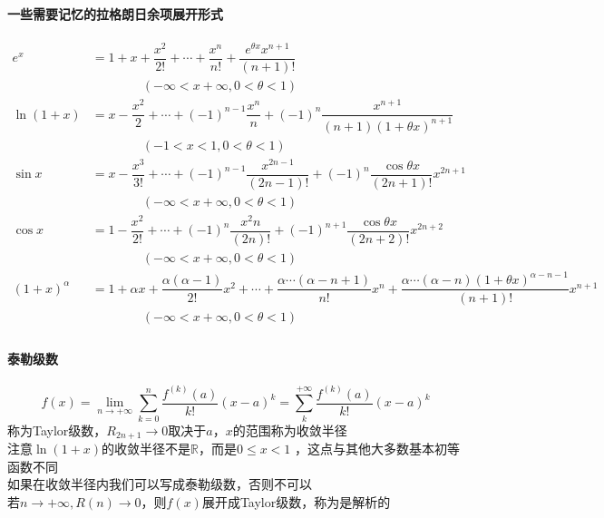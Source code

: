 \documentclass[11pt,hyperref,a4paper,UTF8]{ctexart}
\begin{document}
\begin{CJK}{UTF8}{gkai}
\paragraph{一些需要记忆的拉格朗日余项展开形式}
\[
\begin{aligned}    
e^x &= 1 + x + \dfrac{x^2}{2!} + \cdots + \dfrac{x^n}{n!} + \dfrac{e^{\theta x} x^{n+1}}{(n+1)!}\\
&\quad\quad\quad\quad(-\infty < x + \infty , 0 < \theta < 1)\\
\ln(1 + x) &= x - \dfrac{x^2}{2} + \cdots + (-1)^{n-1} \dfrac{x^n}{n} + (-1)^n \dfrac{x^{n+1}}{(n + 1)(1 + \theta x)^{n + 1}}\\
&\quad\quad\quad\quad(-1 < x < 1 , 0 < \theta < 1)\\
\sin x &= x - \dfrac{x^3}{3!} +\cdots + (-1)^{n-1} \dfrac{x^{2n-1}}{(2n-1)!}+(-1)^{n}\dfrac{\cos\theta x}{(2n + 1)!}x^{2n+1}\\
&\quad\quad\quad\quad(-\infty < x + \infty , 0 < \theta < 1)\\
\cos x &= 1 - \dfrac{x^2}{2!} + \cdots + (-1)^n \dfrac{x^2n}{(2n)!} + (-1)^{n+1} \dfrac{\cos \theta x}{(2n + 2)!} x^{2n + 2}\\
&\quad\quad\quad\quad(-\infty < x + \infty , 0 < \theta < 1)\\
(1 + x)^\alpha &= 1 + \alpha x + \dfrac{\alpha(\alpha - 1)}{2!} x^2 + \cdots + \dfrac{\alpha \cdots (\alpha - n + 1)}{n !} x^n +\dfrac{\alpha \cdots (\alpha - n)(1 + \theta x)^{\alpha - n -1}}{(n + 1)!} x^{n + 1}\\
&\quad\quad\quad\quad(-\infty < x + \infty , 0 < \theta < 1)\\
\end{aligned}
\]

\paragraph{泰勒级数}

\[
f(x) = \lim_{n\to +\infty} \sum_{k = 0} ^n \dfrac{f^{(k)}(a)}{k!}(x-a)^k
= \sum_{k}^{+\infty} \dfrac{f^{(k)}(a)}{k!}(x-a)^k
\]
称为Taylor级数，$R_{2n+1}\to 0$取决于$a$，$x$的范围称为收敛半径\\

注意$\ln(1+x)$的收敛半径不是$\mathbb{R}$，而是$0 \leq x <1$ ，这点与其他大多数基本初等函数不同\\
如果在收敛半径内我们可以写成泰勒级数，否则不可以\\

若$n\to +\infty,R(n) \to 0$，则$f(x)$展开成Taylor级数，称为是解析的\\


\end{CJK}
\end{document}
